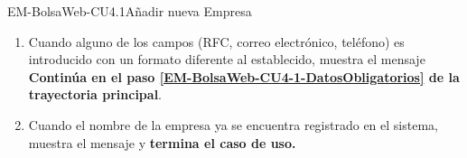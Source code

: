 \begin{UseCase}{EM-BolsaWeb-CU4.1}{Añadir nueva Empresa}
{\begin{enumerate}
			\item \label{EM-BolsaWeb-CU4-1-E2} Cuando alguno de los campos (RFC, correo electrónico, teléfono) es introducido con un formato diferente al establecido, muestra el mensaje  \textbf{Continúa en el paso \ref{EM-BolsaWeb-CU4-1-DatosObligatorios} de la trayectoria principal}.
			\item \label{EM-BolsaWeb-CU4-1-E3} Cuando el nombre de la empresa ya se encuentra registrado en el sistema, muestra el mensaje  y \textbf{termina el caso de uso.}
		\end{enumerate}	
	}
\end{UseCase}

